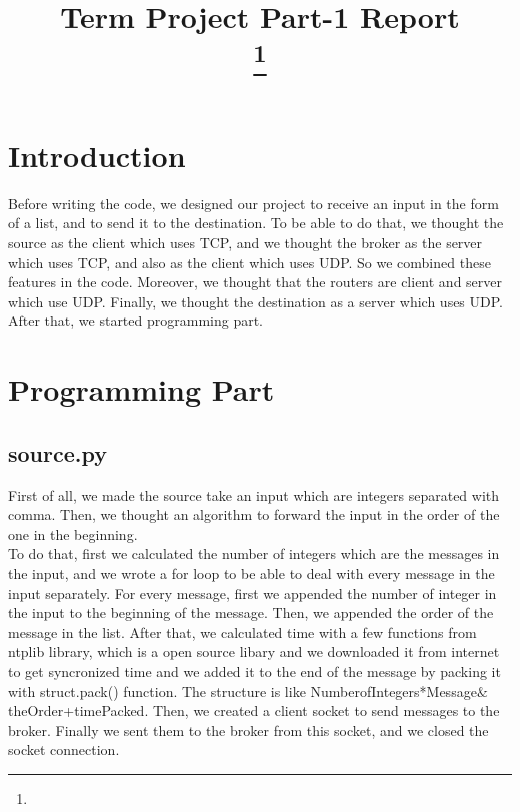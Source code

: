 \documentclass[conference]{IEEEtran}
\begin{document}
\title{Term Project Part-1 Report\\
{\footnotesize \textsuperscript{}}
\thanks{}
}

\author{

}

\maketitle


\section{Introduction}
Before writing the code, we designed our project to receive an input in the form of a list, and to send it to the destination. To be able to do that,  we thought the source as the client which uses TCP, and we thought the broker as the server which uses TCP, and also as the client which uses UDP. So we combined these features in the code. Moreover, we thought that the routers are client and server which use UDP. Finally, we thought the destination as a server which uses UDP. After that, we started programming part.

\section{Programming Part}

\subsection{source.py}
First of all, we made the source take an input which are integers separated with comma. Then, we thought an algorithm to forward the input in the order of the one in the beginning.\\
To do that, first we calculated the number of integers which are the messages in the input, and we wrote a for loop to be able to deal with every message in the input separately. For every message, first we appended the number of integer in the input to the beginning of the message. Then, we appended the order of the message in the list. After that, we calculated time with a few functions from ntplib library, which is a open source libary and we downloaded it from internet to get syncronized time and we added it to the end of the message by packing it with struct.pack() function. The structure is like NumberofIntegers*Message$\&$theOrder+timePacked. Then, we created a client socket to send messages to the broker. Finally we sent them to the broker from this socket, and we closed the socket connection.
\end{document}
